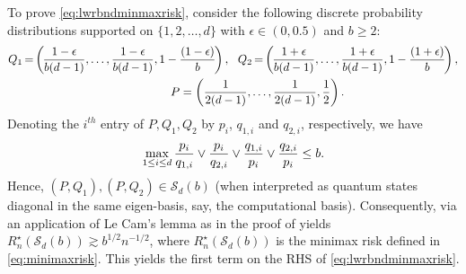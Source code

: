 \documentclass[a4paper,onecolumn,11pt,accepted=2026-05-12]{quantumarticle}
\newcommand{\cS}{\mathcal{S}}
\begin{document}
To prove \eqref{eq:lwrbndminmaxrisk}, consider the following discrete probability distributions supported on $\{1,2,\ldots,d\}$  with $\epsilon \in (0,0.5)$ and $b \geq 2$:
\begin{subequations}\label{eq:distlecam1}
\begin{align}
 & Q_1\mspace{-2 mu}=\mspace{-2 mu}\left(\mspace{-2 mu}\frac{1-\epsilon}{b(d-1)},\ldots,\frac{1-\epsilon}{b(d-1)}, 1-\frac{(1-\epsilon)}{b}\mspace{-2 mu} \right), ~~ Q_2\mspace{-2 mu}=\mspace{-2 mu}\left(\mspace{-2 mu}\frac{1+\epsilon}{b(d-1)},\ldots,\frac{1+\epsilon}{b(d-1)}, 1-\frac{(1+\epsilon)}{b} \mspace{-2 mu}\right),\\
 &\qquad \qquad \qquad \qquad \qquad \qquad \qquad  P=\left(\frac{1}{2(d-1)},\ldots,\frac{1}{2(d-1)}, \frac{1}{2} \right). 
\end{align}
\end{subequations}
Denoting the $i^{th}$ entry of $P,Q_1,Q_2$ by $p_i$, $q_{1,i}$ and $q_{2,i}$, respectively, we have
\begin{align}
    \max_{1 \leq i \leq d} \frac{p_i}{q_{1,i}} \vee \frac{p_i}{q_{2,i}} \vee \frac{q_{1,i}}{p_i} \vee \frac{q_{2,i}}{p_i} \leq b. \notag
\end{align}
Hence, $(P,Q_1), (P,Q_2) \in \cS_d(b)$ (when interpreted as quantum states diagonal in the same eigen-basis, say, the computational basis). 
Consequently, via an application of Le Cam's lemma as in the proof of \cite[Theorem 2]{Yanjun-2020-alphadiv} yields $R_n^{\star}(\cS_d(b)) \gtrsim b^{1/2}n^{-1/2}$, where $R_n^{\star}(\cS_d(b)) $ is the minimax risk  defined in \eqref{eq:minimaxrisk}. This yields the first term on the RHS of \eqref{eq:lwrbndminmaxrisk}. 
\end{document}
